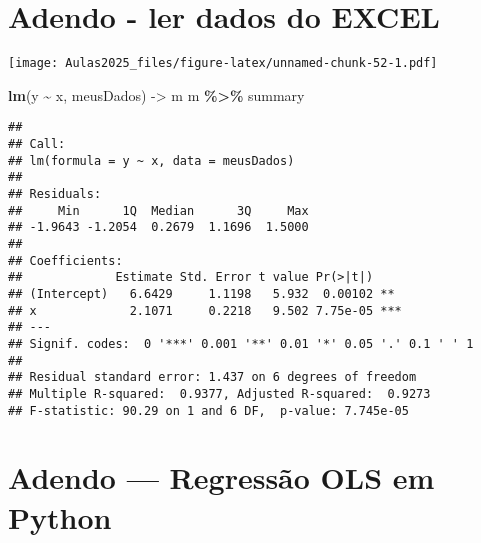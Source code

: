 \documentclass[
]{book}
\newenvironment{Shaded}{\begin{snugshade}}{\end{snugshade}}
\newcommand{\AttributeTok}[1]{\textcolor[rgb]{0.13,0.29,0.53}{#1}}
\newcommand{\CommentTok}[1]{\textcolor[rgb]{0.56,0.35,0.01}{\textit{#1}}}
\newcommand{\DecValTok}[1]{\textcolor[rgb]{0.00,0.00,0.81}{#1}}
\newcommand{\FunctionTok}[1]{\textcolor[rgb]{0.13,0.29,0.53}{\textbf{#1}}}
\newcommand{\NormalTok}[1]{#1}
\newcommand{\OtherTok}[1]{\textcolor[rgb]{0.56,0.35,0.01}{#1}}
\newcommand{\SpecialCharTok}[1]{\textcolor[rgb]{0.81,0.36,0.00}{\textbf{#1}}}
\newcommand{\StringTok}[1]{\textcolor[rgb]{0.31,0.60,0.02}{#1}}
\begin{document}
\hypertarget{adendo---ler-dados-do-excel}{%
\chapter{Adendo - ler dados do
EXCEL}\label{adendo---ler-dados-do-excel}}

\begin{Shaded}
\end{Shaded}

\texttt{[image: Aulas2025\_files/figure-latex/unnamed-chunk-52-1.pdf]}

\begin{Shaded}
\begin{Highlighting}[]
\FunctionTok{lm}\NormalTok{(y }\SpecialCharTok{\textasciitilde{}}\NormalTok{ x, meusDados) }\OtherTok{{-}\textgreater{}}\NormalTok{ m}
\NormalTok{m }\SpecialCharTok{\%\textgreater{}\%}
\NormalTok{    summary}
\end{Highlighting}
\end{Shaded}

\begin{verbatim}
## 
## Call:
## lm(formula = y ~ x, data = meusDados)
## 
## Residuals:
##     Min      1Q  Median      3Q     Max 
## -1.9643 -1.2054  0.2679  1.1696  1.5000 
## 
## Coefficients:
##             Estimate Std. Error t value Pr(>|t|)    
## (Intercept)   6.6429     1.1198   5.932  0.00102 ** 
## x             2.1071     0.2218   9.502 7.75e-05 ***
## ---
## Signif. codes:  0 '***' 0.001 '**' 0.01 '*' 0.05 '.' 0.1 ' ' 1
## 
## Residual standard error: 1.437 on 6 degrees of freedom
## Multiple R-squared:  0.9377, Adjusted R-squared:  0.9273 
## F-statistic: 90.29 on 1 and 6 DF,  p-value: 7.745e-05
\end{verbatim}

\hypertarget{adendo-regressuxe3o-ols-em-python}{%
\chapter{Adendo --- Regressão OLS em
Python}\label{adendo-regressuxe3o-ols-em-python}}
\end{document}
